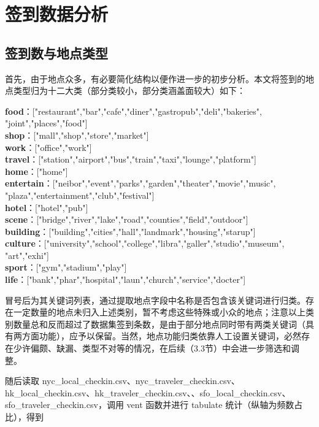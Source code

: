 \documentclass[UTF8]{ctexart}
\begin{document}
	\section{签到数据分析}
		\subsection{签到数与地点类型}
		首先，由于地点众多，有必要简化结构以便作进一步的初步分析。本文将签到的地点类型归为十二大类（部分类较小，部分类涵盖面较大）如下：
		
		\noindent\textbf{food}：["restaurant","bar","cafe","diner","gastropub","deli","bakeries",\\"joint","places","food"]\\
		\textbf{shop}：["mall","shop","store","market"]\\
		\textbf{work}：["office","work"]\\
		\textbf{travel}：["station","airport","bus","train","taxi","lounge","platform"]\\
		\textbf{home}：["home"]\\
		\textbf{entertain}：["neibor","event","parks","garden","theater","movie","music",\\"plaza","entertainment","club","festival"]\\
		\textbf{hotel}：["hotel","pub"]\\
		\textbf{scene}：["bridge","river","lake","road","counties","field","outdoor"]\\
		\textbf{building}：["building","cities","hall","landmark","housing","starup"]\\
		\textbf{culture}：["university","school","college","libra","galler","studio","museum",\\"art","exhi"]\\
		\textbf{sport}：["gym","stadium","play"]\\
		\textbf{life}：["bank","phar","hospital","laun","church","service","docter"]
		
		冒号后为其关键词列表，通过提取地点字段中名称是否包含该关键词进行归类。存在一定数量的地点未归入上述类别，暂不考虑这些特殊或小众的地点；注意以上类别数量总和反而超过了数据集签到条数，是由于部分地点同时带有两类关键词（具有两方面功能），应予以保留。当然，地点功能归类依靠人工设置关键词，必然存在少许偏颇、缺漏、类型不对等的情况，在后续（3.3节）中会进一步筛选和调整。
		
		随后读取 nyc\_local\_checkin.csv、nyc\_traveler\_checkin.csv、hk\_local\_checkin.csv、hk\_traveler\_checkin.csv、、sfo\_local\_checkin.csv、sfo\_traveler\_checkin.csv，调用 vent 函数并进行 tabulate 统计（纵轴为频数占比），得到
		
\end{document}
